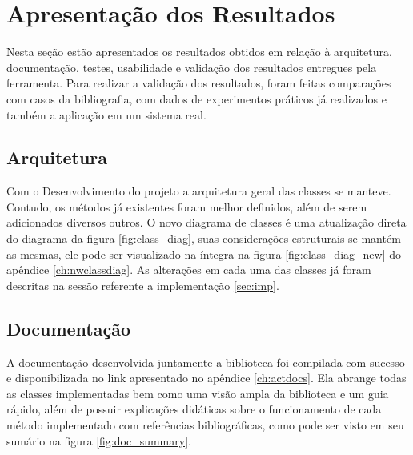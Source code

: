 \chapter{Apresentação dos Resultados}

Nesta seção estão apresentados os resultados obtidos em relação à arquitetura, documentação, testes, usabilidade e
validação dos resultados entregues pela ferramenta.
Para realizar a validação dos resultados, foram feitas comparações com casos da bibliografia, com dados de experimentos
práticos já realizados e também a aplicação em um sistema real.


\section{Arquitetura}
Com o Desenvolvimento do projeto a arquitetura geral das classes se manteve.
Contudo, os métodos já existentes foram melhor definidos, além de serem adicionados diversos outros.
O novo diagrama de classes é uma atualização direta do diagrama da figura \ref{fig:class_diag}, suas considerações
estruturais se mantém as mesmas, ele pode ser visualizado na íntegra na figura \ref{fig:class_diag_new}
do apêndice \ref{ch:nwclassdiag}.
As alterações em cada uma das classes já foram descritas na sessão referente a implementação \ref{sec:imp}.


\section{Documentação}

A documentação desenvolvida juntamente a biblioteca foi compilada com sucesso e disponibilizada no link apresentado
no apêndice \ref{ch:actdocs}.
Ela abrange todas as classes implementadas bem como uma visão ampla da biblioteca e um guia rápido, além de possuir
explicações didáticas sobre o funcionamento de cada método implementado com referências bibliográficas, como pode ser
visto em seu sumário na figura \ref{fig:doc_summary}.

